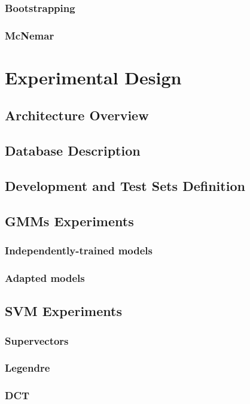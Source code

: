 \documentclass[11pt,a4paper]{tesis}
\begin{document}
		\subsection{Bootstrapping}
		\subsection{McNemar}

\chapter{Experimental Design}
	\section{Architecture Overview}
		
	\section{Database Description}
	\section{Development and Test Sets Definition}
	\section{GMMs Experiments}
		\subsection{Independently-trained models}
		\subsection{Adapted models}
	\section{SVM Experiments}
		\subsection{Supervectors}
		\subsection{Legendre}
			
		\subsection{DCT}
\end{document}
